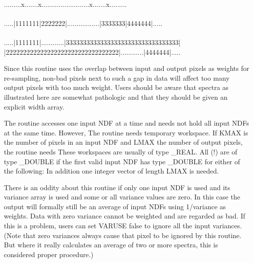 {{{\ssttt
\ \\
.........x.......x.........................x.......x......... \\
\ \\
.....|1111111|2222222|.................|3333333|4444444|..... \\
\ \\
.....|1111111|............|333333333333333333333333333333333| \\
|222222222222222222222222222222222|............|4444444|.....
\ \\
}

      Since this routine uses the overlap between input and output
      pixels as weights for re-sampling, non-bad pixels next to such a
      gap in data will affect too many output pixels with too much
      weight.
      Users should be aware that spectra as illustrated here are
      somewhat pathologic and that they should be given an explicit
      width array.

      The routine accesses one input NDF at a time and needs not hold
      all input NDFs at the same time. However, The routine needs
      temporary workspace. If KMAX is the number of pixels in an input
      NDF and LMAX the number of output pixels, the routine needs
      These workspaces are usually of type \_REAL. All (!) are of type
      \_DOUBLE if the first valid input NDF has type \_DOUBLE for either
      of the following:
      In addition one integer vector of length LMAX is needed.

      There is an oddity about this routine if only one input NDF is
      used and its variance array is used and some or all variance
      values are zero. In this case the output will formally still be an
      average of input NDFs using 1/variance as weights. Data with zero
      variance cannot be weighted and are regarded as bad. If this is a
      problem, users can set VARUSE false to ignore all the input
      variances. (Note that zero variances always cause that pixel to be
      ignored by this routine. But where it really calculates an average
      of two or more spectra, this is considered proper procedure.)
   }
   }
